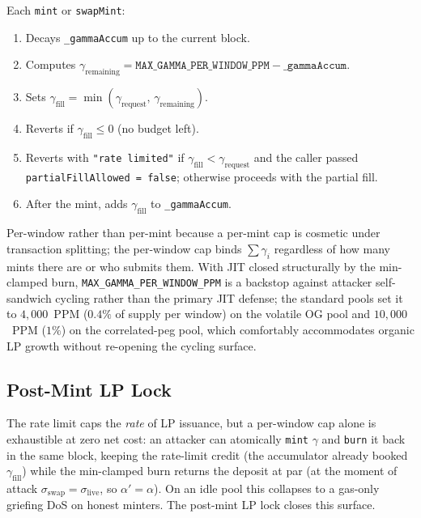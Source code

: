 \documentclass[11pt]{article}
\begin{document}
Each \texttt{mint} or \texttt{swapMint}:
\begin{enumerate}
  \item Decays \texttt{\_gammaAccum} up to the current block.
  \item Computes
        \(\gamma_{\mathrm{remaining}} =
          \texttt{MAX\_GAMMA\_PER\_WINDOW\_PPM} - \texttt{\_gammaAccum}\).
  \item Sets
        \(\gamma_{\mathrm{fill}} =
          \min(\gamma_{\mathrm{request}},\,\gamma_{\mathrm{remaining}})\).
  \item Reverts if $\gamma_{\mathrm{fill}} \le 0$ (no budget left).
  \item Reverts with \texttt{"rate limited"} if
        $\gamma_{\mathrm{fill}} < \gamma_{\mathrm{request}}$ and the
        caller passed \texttt{partialFillAllowed = false}; otherwise
        proceeds with the partial fill.
  \item After the mint, adds $\gamma_{\mathrm{fill}}$ to
        \texttt{\_gammaAccum}.
\end{enumerate}

Per-window rather than per-mint because a per-mint cap is cosmetic
under transaction splitting; the per-window cap binds
$\sum \gamma_i$ regardless of how many mints there are or who submits
them. With JIT closed structurally by the min-clamped burn,
\texttt{MAX\_GAMMA\_PER\_WINDOW\_PPM} is a backstop against
attacker self-sandwich cycling rather than the primary JIT defense; the
standard pools set it to $4{,}000$~PPM ($0.4\%$ of supply per window) on
the volatile OG pool and $10{,}000$~PPM ($1\%$) on the correlated-peg
pool, which comfortably accommodates organic LP growth without
re-opening the cycling surface.

\subsection{Post-Mint LP Lock}
\label{sec:mint-lock}

The rate limit caps the \emph{rate} of LP issuance, but a per-window cap
alone is exhaustible at zero net cost: an attacker can atomically
\texttt{mint} $\gamma$ and \texttt{burn} it back in the same block,
keeping the rate-limit credit (the accumulator already booked
$\gamma_{\mathrm{fill}}$) while the min-clamped burn returns the deposit
at par (at the moment of attack $\sigma_{\mathrm{swap}} =
\sigma_{\mathrm{live}}$, so $\alpha' = \alpha$). On an idle pool this
collapses to a gas-only griefing DoS on honest minters. The post-mint
LP lock closes this surface.
\end{document}
